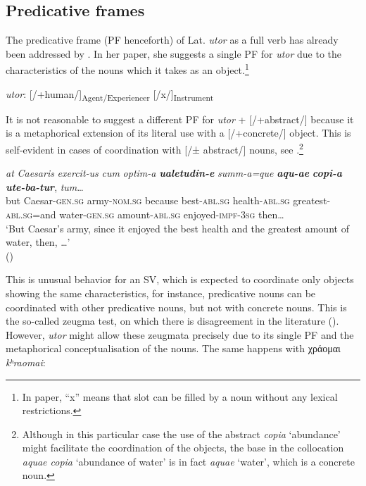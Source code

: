 \documentclass[output=paper,colorlinks,citecolor=brown]{langscibook}
\begin{document}
\subsection{Predicative frames}\label{sec:ma:4:1}

The predicative frame (PF henceforth) of Lat. \emph{utor} as a full verb has already been addressed
by \citet{alonso_fernandez_estructuras_2010}. In her paper, she suggests a single PF for
\emph{utor} due to the characteristics of the nouns which it takes as an
object.\footnote{In \citet{alonso_fernandez_estructuras_2010} paper, ``x'' means that slot
  can be filled by a noun without any lexical restrictions.}

\begin{center}
  \emph{utor}: {[}/+human/{]}\textsubscript{Agent/Experiencer}
  {[}/x/{]}\textsubscript{Instrument}
\end{center}

It is not reasonable to suggest a different PF for \emph{utor} + {[}/+abstract/{]} because
it is a metaphorical extension of its literal use with a {[}/+concrete/{]} object. This is
self-evident in cases of coordination with {[}/± abstract/{]} nouns, see
.\footnote{Although in this particular case the use of the abstract
  \emph{copia} `abundance' might facilitate the coordination of the objects, the base in
  the collocation \emph{aquae copia} `abundance of water' is in fact \emph{aquae} `water',
  which is a concrete noun.}


\ea\label{ex:ma:1}

\gll \emph{at} \textit{Caesaris} \emph{exercit-us} \emph{cum} \emph{optim-a} \textbf{\itshape
  ualetudin-e} \emph{summ-a=que} \textbf{\itshape aqu-ae} \textbf{\itshape copi-a}
\textbf{\itshape
    ute-ba-tur}, \textit{tum}\ldots{}\\
but Caesar-\textsc{gen.sg} army-\textsc{nom.sg} because best-\textsc{abl.sg}
health-\textsc{abl.sg} greatest-\textsc{abl.sg}=and water-\textsc{gen.sg} amount-\textsc{abl.sg} enjoyed-\textsc{impf-3sg} then\ldots{}\\
\glt `But Caesar's army, since it enjoyed the best health and the greatest amount of
water, then, \ldots' \\
\hspace*{\fill}()

\z

This is unusual behavior for an SV, which is expected to coordinate only objects showing
the same characteristics, for instance, predicative nouns can be coordinated with other
predicative nouns, but not with concrete nouns. This is the so-called zeugma test, on which
there is disagreement in the literature (\cite{langer_linguistic_2004}). However,
\emph{utor} might allow these zeugmata precisely due to its single PF and the metaphorical
conceptualisation of the nouns. The same happens with χράομαι
\emph{kʰraomai}:
\end{document}
